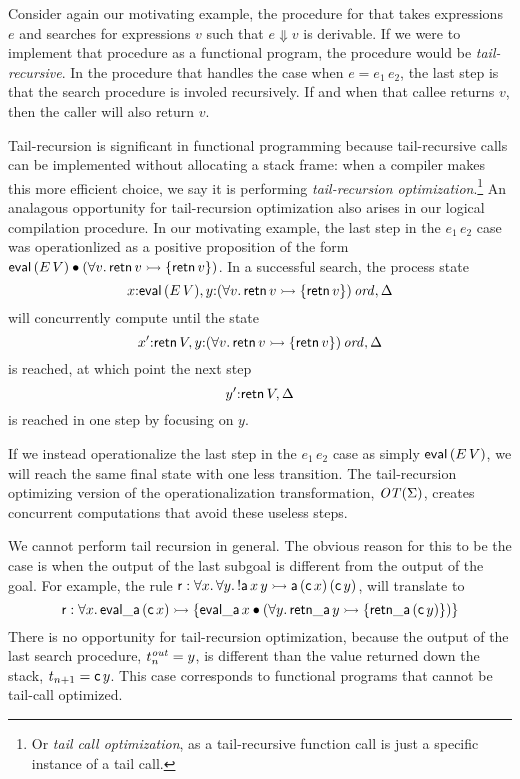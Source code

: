 Consider again our motivating example, the procedure for that takes
expressions $e$ and searches for expressions $v$ such that $e
\Downarrow v$ is derivable. If we were to implement that procedure as
a functional program, the procedure would be {\it tail-recursive}. In
the procedure that handles the case when $e = e_1\,e_2$, the last step
is that the search procedure is involed recursively. If and when that
callee returns $v$, then the caller will also return $v$.

Tail-recursion is significant in functional programming because
tail-recursive calls can be implemented without allocating a stack
frame: when a compiler makes this more efficient choice, we say it is
performing {\it tail-recursion optimization}.\footnote{Or {\it tail
    call optimization}, as a tail-recursive function call is just a
  specific instance of a tail call.} An analagous opportunity for
tail-recursion optimization also arises in our logical compilation
procedure. In our motivating example, the last step in the $e_1\,e_2$
case was operationlized as a positive proposition of the form ${\sf
  eval}\,(E\, V) \mathbin{\bullet} (\forall v.\,{\sf retn}\,v \rightarrowtail \{ {\sf
  retn}\,v \})$. In a successful search, the process state 
\[ x{:}{\sf
  eval}\,(E\, V), y{:}{(\forall v.\,{\sf retn}\,v \rightarrowtail \{
  {\sf retn}\,v \})}\,{{\it ord}}, \Delta\]
will concurrently compute until the
state 
\[ x'{:}{\sf retn}\,V, y{:}{(\forall v.\,{\sf retn}\,v \rightarrowtail
  \{ {\sf retn}\,v \})}\,{{\it ord}}, \Delta\] is reached, at which point the next
step \[y'{:}{\sf retn}\,V, \Delta\] is reached in one step by focusing
on $y$. 

If we instead operationalize the last step in the $e_1\,e_2$ case as
simply ${\sf eval}\,(E\,V)$, we will reach the same final state with
one less transition. The tail-recursion optimizing version of the
operationalization transformation, ${\it OT}({\Sigma})$, creates
concurrent computations that avoid these useless steps.

We cannot perform tail recursion in general. The obvious reason for
this to be the case is when the output of the last subgoal is
different from the output of the goal. For example, the rule ${\sf r}
: \forall{x}.\,\forall{y}.\,{!}{\sf a}\,x\,y \rightarrowtail {\sf a}\,({\sf
  c}\,x)\,({\sf c}\,y)$, will translate to
\[ {\sf r} : \forall{x}.\,{\sf eval\_a}\,({\sf c}\,x) \rightarrowtail \{ {\sf
  eval\_a}\,x \mathbin{\bullet} (\forall y.\, {\sf retn\_a}\,y \rightarrowtail \{ {\sf
  retn\_a}\,({\sf c}\,y) \} ) \} \] There is no opportunity for
tail-recursion optimization, because the output of the last search
procedure, $t^{\it out}_n = y$, is different than the value returned
down the stack, $t_{n+1} = {\sf c}\,y$. This case corresponds to
functional programs that cannot be tail-call optimized.

